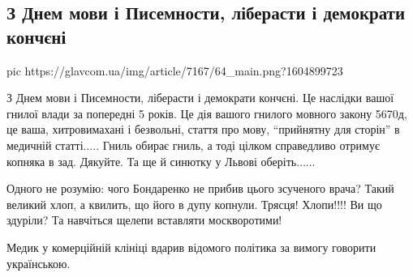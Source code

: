  
 
 

\subsection{З Днем мови і Писемности, ліберасти і демократи кончєні}
\label{sec:09_11_2020.fb.iryna_farion.2.mova_vrach}

\ifcmt
pic https://glavcom.ua/img/article/7167/64_main.png?1604899723
\fi

З Днем мови і Писемности, ліберасти і демократи кончєні. Це наслідки вашої
гнилої влади за попередні 5 років. Це дія вашого гнилого мовного закону 5670д,
це ваша, хитровимахані і безвольні, стаття про мову, \enquote{прийнятну для сторін} в
медичній статті..... Гниль обирає гниль, а тоді цілком справедливо отримує
копняка в зад. Дякуйте. Та ще й синютку у Львові оберіть......

Одного не розумію: чого Бондаренко не прибив цього зсученого врача? Такий
великий хлоп, а квилить, що його в дупу копнули. Трясця! Хлопи!!!! Ви що
здуріли? Та навчіться щелепи вставляти москворотими!

Медик у комерційній клініці вдарив відомого політика за вимогу говорити
українською.
